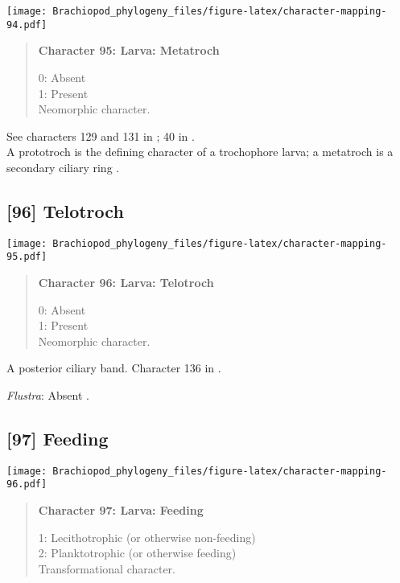 \documentclass[openany]{book}
\theoremstyle{definition}
\theoremstyle{definition}
\theoremstyle{definition}
\theoremstyle{remark}
\begin{document}
\texttt{[image: Brachiopod\_phylogeny\_files/figure-latex/character-mapping-94.pdf]}

\begin{quote}
\textbf{Character 95: Larva: Metatroch}

0: Absent\\
1: Present\\
Neomorphic character.
\end{quote}

See characters 129 and 131 in \citet{Rouse1999}; 40 in
\citet{Haszprunar1996}.\\
A prototroch is the defining character of a trochophore larva; a
metatroch is a secondary ciliary ring \citep{Rouse1999}.

\subsection*{{[}96{]} Telotroch}\label{telotroch}

\texttt{[image: Brachiopod\_phylogeny\_files/figure-latex/character-mapping-95.pdf]}

\begin{quote}
\textbf{Character 96: Larva: Telotroch}

0: Absent\\
1: Present\\
Neomorphic character.
\end{quote}

A posterior ciliary band. Character 136 in \citet{Rouse1999}.

\hypertarget{Flustra-coding-96}{}
\emph{Flustra}: Absent \citep{Zimmer2013}.

\subsection*{{[}97{]} Feeding}\label{feeding}

\texttt{[image: Brachiopod\_phylogeny\_files/figure-latex/character-mapping-96.pdf]}

\begin{quote}
\textbf{Character 97: Larva: Feeding}

1: Lecithotrophic (or otherwise non-feeding)\\
2: Planktotrophic (or otherwise feeding)\\
Transformational character.
\end{quote}
\end{document}
